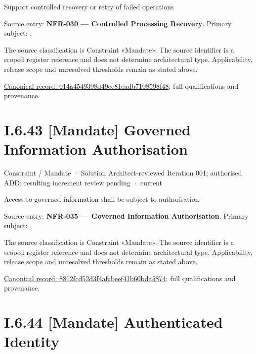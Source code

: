 Support controlled recovery or retry of failed operations



Source entry: \textbf{NFR-030 — Controlled Processing Recovery}. Primary subject: \texttt{}.



The source classification is Constraint «Mandate». The source identifier is a scoped register reference and does not determine architectural type. Applicability, release scope and unresolved thresholds remain as stated above.


{\footnotesize \href{../../../../../../../../continuum/motivation/constraint/mandate/014a4549398d49ee81eadb7108598f48.md}{Canonical record: 014a4549398d49ee81eadb7108598f48}; full qualifications and provenance.}\par
\section*{I.6.43 [Mandate] Governed Information Authorisation}
\label{navigation:I.6.43}

\label{element:8812fcd52d3f4afcbeef41b60bda5874}
{\small Constraint / Mandate · Solution Architect-reviewed Iteration 001; authorised ADD; resulting increment review pending · current}\par

Access to governed information shall be subject to authorisation.



Source entry: \textbf{NFR-035 — Governed Information Authorisation}. Primary subject: \texttt{}.



The source classification is Constraint «Mandate». The source identifier is a scoped register reference and does not determine architectural type. Applicability, release scope and unresolved thresholds remain as stated above.


{\footnotesize \href{../../../../../../../../continuum/motivation/constraint/mandate/8812fcd52d3f4afcbeef41b60bda5874.md}{Canonical record: 8812fcd52d3f4afcbeef41b60bda5874}; full qualifications and provenance.}\par
\section*{I.6.44 [Mandate] Authenticated Identity}
\label{navigation:I.6.44}

